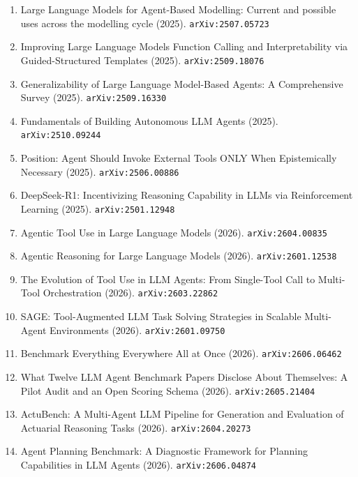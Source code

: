\documentclass[11pt]{article}
\begin{document}
\begin{enumerate}
  \item Large Language Models for Agent-Based Modelling: Current and possible uses across the modelling cycle (2025). \texttt{arXiv:2507.05723}
  \item Improving Large Language Models Function Calling and Interpretability via Guided-Structured Templates (2025). \texttt{arXiv:2509.18076}
  \item Generalizability of Large Language Model-Based Agents: A Comprehensive Survey (2025). \texttt{arXiv:2509.16330}
  \item Fundamentals of Building Autonomous LLM Agents (2025). \texttt{arXiv:2510.09244}
  \item Position: Agent Should Invoke External Tools ONLY When Epistemically Necessary (2025). \texttt{arXiv:2506.00886}
  \item DeepSeek-R1: Incentivizing Reasoning Capability in LLMs via Reinforcement Learning (2025). \texttt{arXiv:2501.12948}
  \item Agentic Tool Use in Large Language Models (2026). \texttt{arXiv:2604.00835}
  \item Agentic Reasoning for Large Language Models (2026). \texttt{arXiv:2601.12538}
  \item The Evolution of Tool Use in LLM Agents: From Single-Tool Call to Multi-Tool Orchestration (2026). \texttt{arXiv:2603.22862}
  \item SAGE: Tool-Augmented LLM Task Solving Strategies in Scalable Multi-Agent Environments (2026). \texttt{arXiv:2601.09750}
  \item Benchmark Everything Everywhere All at Once (2026). \texttt{arXiv:2606.06462}
  \item What Twelve LLM Agent Benchmark Papers Disclose About Themselves: A Pilot Audit and an Open Scoring Schema (2026). \texttt{arXiv:2605.21404}
  \item ActuBench: A Multi-Agent LLM Pipeline for Generation and Evaluation of Actuarial Reasoning Tasks (2026). \texttt{arXiv:2604.20273}
  \item Agent Planning Benchmark: A Diagnostic Framework for Planning Capabilities in LLM Agents (2026). \texttt{arXiv:2606.04874}
\end{enumerate}
\end{document}
